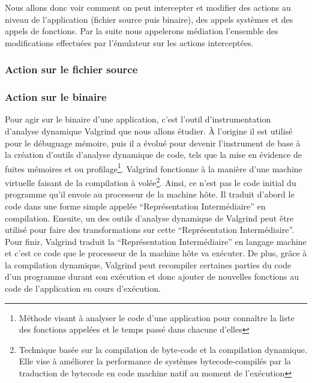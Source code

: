 Nous allons donc voir comment on peut intercepter et modifier des actions au niveau de l'application (fichier source puis binaire), des appels systèmes et des appels de fonctions. Par la suite nous appelerons médiation l'ensemble des modifications effectuées par l'émulateur sur les actions interceptées.

\subsubsection{Action sur le fichier source}

\subsubsection{Action sur le binaire}
Pour agir sur le binaire d'une application, c'est l'outil d'instrumentation
d'analyse dynamique Valgrind\citet{INTERCEPTION:Valgrind,
  INTERCEPTION:Valgrind_web} que nous allons étudier. À l'origine il est utilisé
pour le débuguage mémoire, puis il a évolué pour devenir l'instrument de base à
la création d'outils d'analyse dynamique de code, tels que la mise en évidence
de fuites mémoires et ou profilage\footnote{Méthode visant à analyser le code
  d'une application pour connaître la liste des fonctions appelées et le temps
  passé dans chacune d'elles}. Valgrind fonctionne à la manière d'une machine
virtuelle faisant de la compilation à volée\footnote{Technique basée sur la
  compilation de byte-code et la compilation dynamique. Elle vise à améliorer la
  performance de systèmes bytecode-compilés par la traduction de bytecode en
  code machine natif au moment de l'exécution}. Ainsi, ce n'est pas le code
initial du programme qu'il envoie au processeur de la machine hôte. Il traduit
d'abord le code dans une forme simple appelée ``Représentation Intermédiaire''
en compilation. Ensuite, un des outils d'analyse dynamique de Valgrind peut être
utilisé pour faire des transformations sur cette ``Représentation
Intermédiaire''. Pour finir, Valgrind traduit la ``Représentation
Intermédiaire'' en langage machine et c'est ce code que le processeur de la
machine hôte va exécuter. De plus, grâce à la compilation dynamique, Valgrind
peut recompiler certaines parties du code d'un programme durant son exécution et
donc ajouter de nouvelles fonctions au code de l'application en cours
d'exécution.

